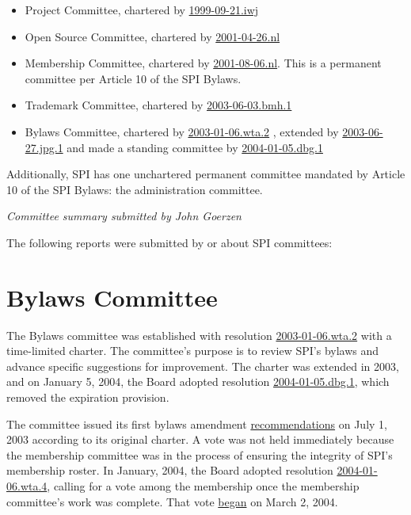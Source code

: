 \documentclass[letterpaper]{report}
\begin{document}
\begin{itemize}
\item Project Committee, chartered by \href{http://www.spi-inc.org/corporate/resolutions/1999/1999-09-21.iwj}{1999-09-21.iwj}
\item Open Source Committee, chartered by \href{http://www.spi-inc.org/corporate/resolutions/2001/2001-04-26.nl}{2001-04-26.nl}
\item Membership Committee, chartered by \href{http://www.spi-inc.org/corporate/resolutions/2001/2001-08-06.nl}{2001-08-06.nl}.
This is a permanent committee per Article 10 of the SPI Bylaws.
\item Trademark Committee, chartered by \href{http://www.spi-inc.org/corporate/resolutions/2003/2003-06-03.bmh.1}{2003-06-03.bmh.1}
\item Bylaws Committee, chartered by \href{http://www.spi-inc.org/corporate/resolutions/2003/2003-01-06.wta.2}{2003-01-06.wta.2}
, extended by \href{http://www.spi-inc.org/corporate/resolutions/2003/2003-06-27.jpg.1}{2003-06-27.jpg.1}
and made a standing committee by \href{http://lists.spi-inc.org/pipermail/spi-announce/2004/000067.html}{2004-01-05.dbg.1}
\end{itemize}

Additionally, SPI has one unchartered permanent committee mandated
by Article 10 of the SPI Bylaws: the administration committee.

\emph{Committee summary submitted by John Goerzen}

\vspace{1em}

The following reports were submitted by or about SPI committees:

\section{Bylaws Committee}

The Bylaws committee was established with resolution \href{http://www.spi-inc.org/corporate/resolutions/2003/2003-01-06.wta.2}{2003-01-06.wta.2}
with a time-limited charter. The committee's purpose is to review
SPI's bylaws and advance specific suggestions for improvement. The
charter was extended in 2003, and on January 5, 2004, the Board adopted
resolution \href{http://lists.spi-inc.org/pipermail/spi-announce/2004/000067.html}{2004-01-05.dbg.1},
which removed the expiration provision.

The committee issued its first bylaws amendment \href{http://gopher.quux.org:70/devel/bylaws/20030701.html}{recommendations}
on July 1, 2003 according to its original charter. A vote was not
held immediately because the membership committee was in the process
of ensuring the integrity of SPI's membership roster. In January,
2004, the Board adopted resolution \href{http://lists.spi-inc.org/pipermail/spi-announce/2004/000066.html}{2004-01-06.wta.4},
calling for a vote among the membership once the membership committee's
work was complete. That vote \href{http://lists.spi-inc.org/pipermail/spi-announce/2004/000071.html}{began}
on March 2, 2004.
\end{document}
